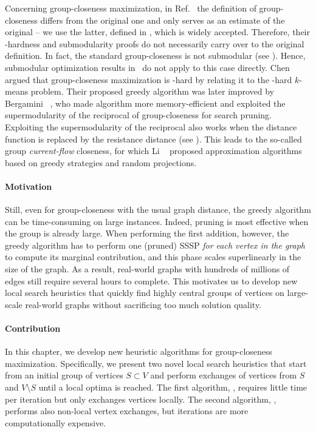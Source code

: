 Concerning group-closeness maximization, in Ref.~\cite{DBLP:conf/www/ZhaoLTG14}
the definition of group-closeness differs from the original one and only serves
as an estimate of the original -- we use the latter, defined in
, which is widely accepted. Therefore, their \np-hardness
and submodularity proofs do not necessarily carry over to the original
definition. In fact, the standard group-closeness is not submodular (see
). Hence, submodular optimization results
in~\cite{DBLP:conf/focs/Vondrak09} do not apply to this case directly.
%
Chen \etal~\cite{DBLP:conf/adc/ChenWW16} argued that group-closeness
maximization is \np-hard by relating it to the \np-hard $k$-means problem.
Their proposed greedy algorithm was later improved by Bergamini
\etal~\cite{DBLP:conf/alenex/BergaminiGM18}, who made algorithm more
memory-efficient and exploited the supermodularity of the reciprocal
of group-closeness for search pruning.
%
Exploiting the supermodularity of the reciprocal also works when the distance
function is replaced by the resistance distance (see
). This leads to the so-called group
\emph{current-flow} closeness, for which Li
\etal~\cite{DBLP:conf/www/0002PSYZ19} proposed approximation algorithms based
on greedy strategies and random projections.

\paragraph{Motivation}
Still, even for group-closeness with the usual graph distance, the greedy
algorithm can be time-consuming on large instances. Indeed, pruning is most
effective when the group is already large. When performing the first addition,
however, the greedy algorithm has to perform one (pruned) SSSP
\emph{for each vertex in the graph} to compute its marginal contribution, and
this phase scales superlinearly in the size of the graph.
As a result, real-world graphs with hundreds of millions of edges still require
several hours to complete.
%
This motivates us to develop new local search heuristics that quickly find
highly central groups of vertices on large-scale real-world
graphs without sacrificing too much solution quality.

\paragraph{Contribution}
%
In this chapter, we develop new heuristic algorithms for group-closeness
maximization. Specifically, we present two
novel local search heuristics that start from an initial group of vertices $S
\subset V$ and perform exchanges of vertices from $S$ and $V \setminus S$ until
a local optima is reached. The first algorithm, \localswaps, requires little
time per iteration but only exchanges vertices locally. The second algorithm,
\growshrink, performs also non-local vertex exchanges, but iterations are more
computationally expensive.

